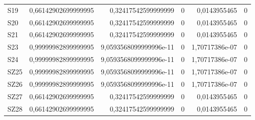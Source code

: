 \begin{longtable}{lrrrrr}
S19 & 0,66142902699999995 & 0,32417542599999999 & 0 & 0,0143955465 & 0 \\
S20 & 0,66142902699999995 & 0,32417542599999999 & 0 & 0,0143955465 & 0 \\
S21 & 0,66142902699999995 & 0,32417542599999999 & 0 & 0,0143955465 & 0 \\
S23 & 0,99999982899999995 & 9,0593568099999996e-11 & 0 & 1,70717386e-07 & 0 \\
S24 & 0,99999982899999995 & 9,0593568099999996e-11 & 0 & 1,70717386e-07 & 0 \\
SZ25 & 0,99999982899999995 & 9,0593568099999996e-11 & 0 & 1,70717386e-07 & 0 \\
SZ26 & 0,99999982899999995 & 9,0593568099999996e-11 & 0 & 1,70717386e-07 & 0 \\
SZ27 & 0,66142902699999995 & 0,32417542599999999 & 0 & 0,0143955465 & 0 \\
SZ28 & 0,66142902699999995 & 0,32417542599999999 & 0 & 0,0143955465 & 0 \\
\hline
\end{longtable}